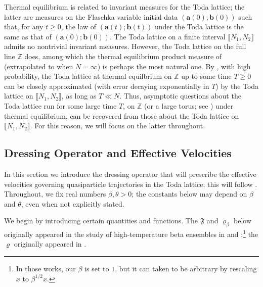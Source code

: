 \documentclass{amsart}
\numberwithin{equation}{section}
\theoremstyle{remark}
\theoremstyle{definition}
\begin{document}
	Thermal equilibrium is related to invariant measures for the Toda lattice; the latter are measures on the Flaschka variable initial data $(\bm{a}(0);\bm{b}(0))$ such that, for any $t \ge 0$, the law of $(\bm{a}(t); \bm{b}(t))$ under the Toda lattice is the same as that of $(\bm{a}(0); \bm{b}(0))$. The Toda lattice on a finite interval $\llbracket N_1, N_2 \rrbracket$ admits no nontrivial invariant measures. However, the Toda lattice on the full line $\mathbb{Z}$ does, among which the thermal equilibrium product measure of  (extrapolated to when $N=\infty$) is perhaps the most natural one. By \cite[Proposition 2.5]{LC}, with high probability, the Toda lattice at thermal equilbrium on $\mathbb{Z}$ up to some time $T \ge 0$ can be closely approximated (with error decaying exponentially in $T$) by the Toda lattice on $\llbracket N_1, N_2 \rrbracket$, as long as $T \ll N$. Thus, asymptotic questions about the Toda lattice run for some large time $T$, on $\mathbb{Z}$ (or a large torus; see \cite[Proposition 4.3]{LC}) under thermal equilibrium, can be recovered from those about the Toda lattice on $\llbracket N_1, N_2 \rrbracket$. For this reason, we will focus on the latter throughout. 
	
	\subsection{Dressing Operator and Effective Velocities}
	\label{TOperator}
	
	In this section we introduce the dressing operator that will prescribe the effective velocities governing quasiparticle trajectories in the Toda lattice; this will follow \cite[Equation (3.57)]{HSIMS}. Throughout, we fix real numbers $\beta, \theta > 0$; the constants below may depend on $\beta$ and $\theta$, even when not explicitly stated.
	
	We begin by introducing certain quantities and functions. The $\mathfrak{F}$ and $\varrho_{\beta}$ below originally appeared in the study of high-temperature beta ensembles in \cite[Equation (16)]{IEC} and \cite[Theorem 1.1(ii)]{SMRME};\footnote{In those works, our $\beta$ is set to $1$, but it can taken to be arbitrary by rescaling $x$ to $\beta^{1/2} x$.} the $\varrho$ originally appeared in \cite[Equation (3.5)]{GECC}.
	
\end{document}
